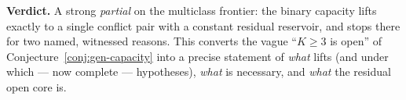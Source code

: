 \begin{remark}
\textbf{Verdict.} A strong \emph{partial} on the multiclass frontier: the binary capacity
lifts exactly to a single conflict pair with a constant residual reservoir, and stops there
for two named, witnessed reasons. This converts the vague ``$K\ge3$ is open'' of
Conjecture~\ref{conj:gen-capacity} into a precise statement of \emph{what} lifts (and under
which --- now complete --- hypotheses), \emph{what} is necessary, and \emph{what} the
residual open core is.
\end{remark}
